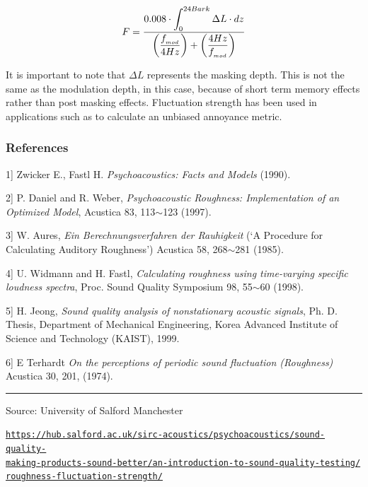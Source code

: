 \[ F = {0.008 \cdot \displaystyle \int_0^{24Bark} \Delta L \cdot dz \over \displaystyle \left({f_{_{mod}} \over 4Hz}\right) + \displaystyle \left({4Hz \over f_{_{mod}}}\right) } \]

It is important to note that $\Delta L$ represents the masking depth.
This is not the same as the modulation depth, in this case, because of
short term memory effects rather than post masking effects. Fluctuation
strength has been used in applications such as to calculate an unbiased
annoyance metric.

\subsubsection*{References}\label{references}

{\small 
\noindent {[}1{]} Zwicker E., Fastl H. \textit{Psychoacoustics: Facts and Models} (1990).

\noindent {[}2{]} P. Daniel and R. Weber, \textit{Psychoacoustic Roughness:
Implementation of an Optimized Model}, Acustica 83, 113$\sim$123 (1997).

\noindent {[}3{]} W. Aures, \textit{Ein Berechnungsverfahren der Rauhigkeit} (`A
Procedure for Calculating Auditory Roughness') Acustica 58, 268$\sim$281 (1985).

\noindent {[}4{]} U. Widmann and H. Fastl, \textit{Calculating roughness using
time-varying specific loudness spectra}, Proc. Sound Quality Symposium 98, 55$\sim$60 (1998).

\noindent {[}5{]} H. Jeong, \textit{Sound quality analysis of nonstationary acoustic
signals}, Ph. D. Thesis, Department of Mechanical Engineering, Korea
Advanced Institute of Science and Technology (KAIST), 1999.

\noindent {[}6{]} E Terhardt \textit{On the perceptions of periodic sound fluctuation
(Roughness)} Acustica 30, 201, (1974).
}

\begin{center}\rule{0.5\linewidth}{0.5pt}\end{center}


Source:  University of Salford Manchester 

\href{https://hub.salford.ac.uk/sirc-acoustics/psychoacoustics/sound-quality-making-products-sound-better/an-introduction-to-sound-quality-testing/roughness-fluctuation-strength/}{\texttt{\small https://hub.salford.ac.uk/sirc-acoustics/psychoacoustics/sound-quality-\\ \indent making-products-sound-better/an-introduction-to-sound-quality-testing/\\ \indent roughness-fluctuation-strength/}}
%
